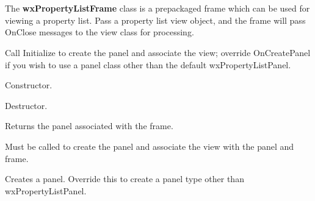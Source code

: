 \section{}\label{wxpropertylistframe}

The {\bf wxPropertyListFrame} class is a prepackaged frame which can
be used for viewing a property list. Pass a property list view object, and the frame
will pass OnClose messages to the view class for processing.

Call Initialize to create the panel and associate the view; override OnCreatePanel
if you wish to use a panel class other than the default wxPropertyListPanel.




Constructor.



Destructor.



Returns the panel associated with the frame.



Must be called to create the panel and associate the view with the panel and frame.



Creates a panel. Override this to create a panel type other than wxPropertyListPanel.


